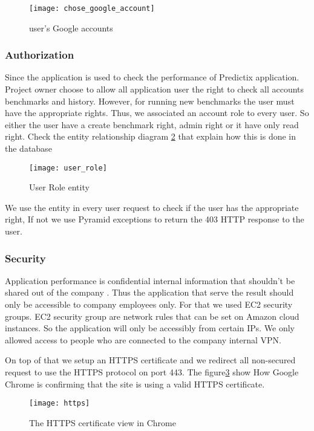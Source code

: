 \begin{figure}[h]
  \centerline{\texttt{[image: chose\_google\_account]}}
\caption{user's Google accounts}
\label{fig:google_auth}
\end{figure}

\subsubsection{Authorization}
Since the application is used to check the performance of Predictix application.
Project owner choose to allow all application user the right to check all
accounts benchmarks and history. However, for running new benchmarks the user
must have the appropriate rights. Thus, we associated an account role to every
user. So either the user have a create benchmark right, admin right or it have
only read right. Check the entity relationship diagram
\hyperref[fig:user_role]{\ref{fig:user_role}} that explain how this is
done in the database
\begin{figure}[h]
  \centerline{\texttt{[image: user\_role]}}
\caption{User Role entity}
\label{fig:user_role}
\end{figure}
We use the entity in every user request to check if the user has the appropriate
right, If not we use Pyramid exceptions to return the 403 HTTP response to the
user.

\subsubsection{Security}
Application performance is confidential internal information that shouldn't be
shared out of the company . Thus the application that serve the result should
only be accessible to company employees only. For that we used EC2 security
groups.
EC2 security group \cite{ec2_sg} are network rules that can be set on Amazon cloud instances.
So the application will only be accessibly from certain IPs. We only allowed
access to people who are connected to the company internal VPN.

On top of that we setup an HTTPS certificate and we redirect all non-secured
request to use the HTTPS protocol on port 443. The
figure\hyperref[fig:https]{\ref{fig:https}} show How Google Chrome is
confirming that the site is using a valid HTTPS certificate.
\begin{figure}[h]
  \centerline{\texttt{[image: https]}}
\caption{The HTTPS certificate view in Chrome}
\label{fig:https}
\end{figure}

